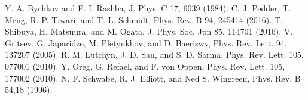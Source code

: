 \documentclass[aps,prb,twocolumn,showpacs,amssymb]{revtex4-1}
\begin{document}
\begin{thebibliography}{99}
 Y. A. Bychkov and E. I. Rashba, J. Phys. C 17, 6039 (1984).
 C. J. Pedder, T. Meng, R. P. Tiwari, and T. L. Schmidt, Phys. Rev. B 94, 245414 (2016).
 T. Shibuya, H. Matsuura, and M. Ogata, J. Phys. Soc. Jpn 85, 114701 (2016).
 V. Gritsev, G. Japaridze, M. Pletyukhov, and D. Baeriswy, Phys. Rev. Lett. 94, 137207 (2005).
 R. M. Lutchyn, J. D. Sau, and S. D. Sarma, Phys. Rev. Lett. 105, 077001 (2010).
 Y. Oreg, G. Refael, and F. von Oppen, Phys. Rev. Lett. 105, 177002 (2010).
 N. F. Schwabe, R. J. Elliott, and Ned S. Wingreen, Phys. Rev. B 54,18 (1996).
\end{thebibliography}
\end{document}

